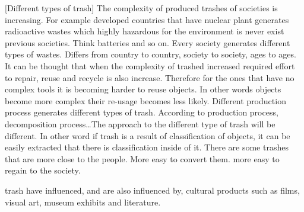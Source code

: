 [Different types of trash] The complexity of produced trashes of societies is increasing. For example developed countries that have nuclear plant generates radioactive wastes which highly hazardous for the environment is never exist previous societies. Think batteries and so on. Every society generates different types of wastes. Differs from country to country, society to society, ages to ages. It can be thought that when the complexity of trashed increased required effort to repair, reuse and recycle is also increase. Therefore for the ones that have no complex tools it is becoming harder to reuse objects. In other words objects become more complex their re-usage becomes less likely.  Different production process generates different types of trash. According to production process, decomposition process\ldots The approach to the different type of trash will be different. In other word if trash is a result of classification of objects, it can be easily extracted that there is classification inside of it. There are some trashes that are more close to the people. More easy to convert them. more easy to regain to the society. 






trash have influenced, and are also influenced by, cultural products such as films, visual art, museum exhibits and literature. 

